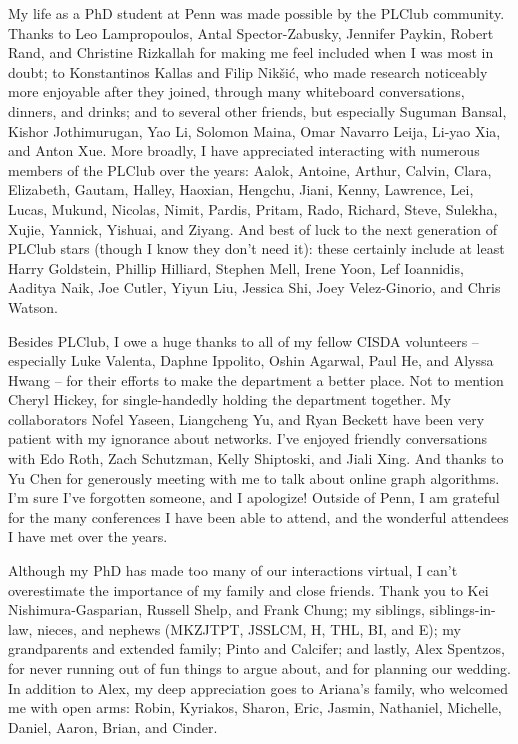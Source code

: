 My life as a PhD student at Penn was made possible by the PLClub community.
Thanks to Leo Lampropoulos, Antal Spector-Zabusky, Jennifer Paykin, Robert Rand, and Christine Rizkallah for making me feel included when I was most in doubt;
to Konstantinos Kallas and Filip Nikšić, who made research noticeably more enjoyable after they joined, through many whiteboard conversations, dinners, and drinks;
and to several other friends, but especially Suguman Bansal, Kishor Jothimurugan, Yao Li, Solomon Maina, Omar Navarro Leija, Li-yao Xia, and Anton Xue.
More broadly, I have appreciated interacting with numerous members of the PLClub over the years:
Aalok, Antoine, Arthur, Calvin, Clara,
Elizabeth, Gautam, Halley, Haoxian, Hengchu,
Jiani, Kenny, Lawrence, Lei, Lucas,
Mukund, Nicolas, Nimit, Pardis, Pritam,
Rado, Richard, Steve, Sulekha, Xujie,
Yannick, Yishuai, and Ziyang.
And best of luck to the next generation of PLClub stars
(though I know they don't need it):
these certainly include at least
Harry Goldstein, Phillip Hilliard, Stephen Mell, Irene Yoon,
Lef Ioannidis, Aaditya Naik,
Joe Cutler, Yiyun Liu, Jessica Shi, Joey Velez-Ginorio, and Chris Watson.

Besides PLClub, I owe a huge thanks to all of my fellow CISDA volunteers -- especially Luke Valenta, Daphne Ippolito, Oshin Agarwal, Paul He, and Alyssa Hwang -- for their efforts to make the department a better place.
Not to mention Cheryl Hickey, for single-handedly holding the department together.
My collaborators Nofel Yaseen, Liangcheng Yu, and Ryan Beckett have been very patient with my ignorance about networks.
I've enjoyed friendly conversations with Edo Roth, Zach Schutzman, Kelly Shiptoski, and Jiali Xing.
And thanks to Yu Chen for generously meeting with me to talk about online graph algorithms.
I'm sure I've forgotten someone, and I apologize!
Outside of Penn, I am grateful for the many conferences I have been able to attend, and the wonderful attendees I have met over the years.

Although my PhD has made too many of our interactions virtual, I can't overestimate the importance of my family and close friends.
Thank you to Kei Nishimura-Gasparian, Russell Shelp, and Frank Chung; my siblings, siblings-in-law, nieces, and nephews (MKZJTPT, JSSLCM, H, THL, BI, and E); my grandparents and extended family; Pinto and Calcifer;
and lastly, Alex Spentzos, for never running out of fun things to argue about, and for planning our wedding. In addition to Alex, my deep appreciation goes to Ariana's family, who welcomed me with open arms: Robin, Kyriakos, Sharon, Eric, Jasmin, Nathaniel, Michelle, Daniel, Aaron, Brian, and Cinder.

